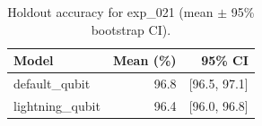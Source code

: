 \begin{table}[ht]
\centering
\caption{Holdout accuracy for exp_021 (mean $\pm$ 95\% bootstrap CI).}
\label{tab:exp_021}
\begin{tabular}{lrr}
\toprule
Model & Mean (\%) & 95\% CI \\
\midrule
default\_qubit & 96.8 & [96.5, 97.1] \\
lightning\_qubit & 96.4 & [96.0, 96.8] \\
\bottomrule
\end{tabular}
\end{table}
